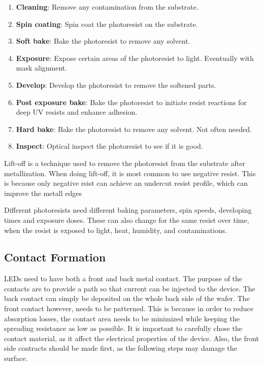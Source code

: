 
\begin{enumerate}
    \item \textbf{Cleaning}: Remove any contamination from the substrate.
    \item \textbf{Spin coating}: Spin coat the photoresist on the substrate.
    \item \textbf{Soft bake}: Bake the photoresist to remove any solvent.
    \item \textbf{Exposure}: Expose certain areas of the photoresist to light. Eventually with mask alignment.
    \item \textbf{Develop}: Develop the photoresist to remove the softened parts.
    \item \textbf{Post exposure bake}: Bake the photoresist to initiate resist reactions for deep UV resists and enhance adhesion. 
    \item \textbf{Hard bake}: Bake the photoresist to remove any solvent. Not often needed.
    \item \textbf{Inspect}: Optical inspect the photoresist to see if it is good.
\end{enumerate} 

Lift-off is a technique used to remove the photoresist from the substrate after metallization.
When doing lift-off, it is most common to use negative resist. 
This is because only negative rsist can achieve an undercut resist profile, which can improve the metall edges

Different photoresists need different baking parameters, spin speeds, developing times and exposure doses.
These can also change for the same resist over time, when the resist is exposed to light, heat, humidity, and contaminations.

\subsection{Contact Formation}

LEDs need to have both a front and back metal contact.
The purpose of the contacts are to provide a path so that  current can be injected to the device. 
The back contact can simply be deposited on the whole back side of the wafer.
The front contact however, needs to be patterned.
This is because in order to reduce absorption losses, the contact area needs to be minimized while keeping the spreading resistance as low as possible.
It is important to carefully chose the contact material, as it affect the electrical properties of the device.
Also, the front side contracts should be made first, as the following steps may damage the surface.

